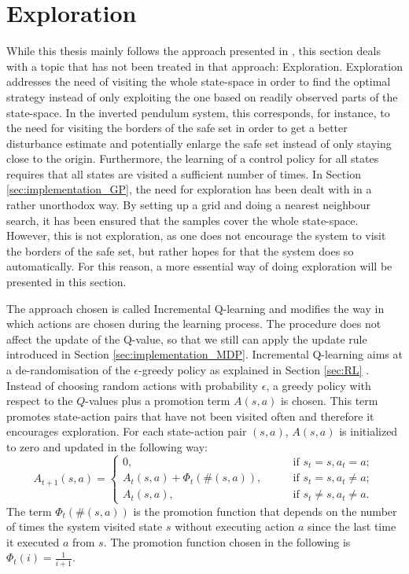 \documentclass[../main.tex]{subfiles}
\begin{document}
\section{Exploration} \label{sec:Exploration}
While this thesis mainly follows the approach presented in \cite{akametalu2014reachability}, this section deals with a topic that has not been treated in that approach: Exploration. Exploration addresses the need of visiting the whole state-space in order to find the optimal strategy instead of only exploiting the one based on readily observed parts of the state-space. In the inverted pendulum system, this corresponds, for instance, to the need for visiting the borders of the safe set in order to get a better disturbance estimate and potentially enlarge the safe set instead of only staying close to the origin. Furthermore, the learning of a control policy for all states requires that all states are visited a sufficient number of times. In Section \ref{sec:implementation_GP}, the need for exploration has been dealt with in a rather unorthodox way. By setting up a grid and doing a nearest neighbour search, it has been ensured that the samples cover the whole state-space. However, this is not exploration, as one does not encourage the system to visit the borders of the safe set, but rather hopes for that the system does so automatically. For this reason, a more essential way of doing exploration will be presented in this section. \par 
The approach chosen is called Incremental Q-learning and modifies the way in which actions are chosen during the learning process. The procedure does not affect the update of the Q-value, so that we still can apply the update rule introduced in Section \ref{sec:implementation_MDP}. Incremental Q-learning aims at a de-randomisation of the $\epsilon$-greedy policy as explained in Section \ref{sec:RL} \cite{even2001convergence}. Instead of choosing random actions with probability $\epsilon$, a greedy policy with respect to the $Q$-values plus a promotion term $A(s,a)$ is chosen. This term promotes state-action pairs that have not been visited often and therefore it encourages exploration. For each state-action pair $(s,a)$, $A(s,a)$ is initialized to zero and updated in the following way:
\begin{equation}
    A_{t+1}(s,a) = 
\begin{cases}
    0,\qquad &\text{if } s_t = s, a_t = a;\\    
    A_{t}(s,a) + \Phi_t(\#(s,a)),\qquad &\text{if } s_t = s, a_t \neq a;\\
    A_{t}(s,a),\qquad &\text{if } s_t \neq s, a_t \neq a.
\end{cases}
\end{equation}
The term $\Phi_t(\#(s,a))$ is the promotion function that depends on the number of times the system visited state $s$ without executing action $a$ since the last time it executed $a$ from $s$. The promotion function chosen in the following is $\Phi_t(i) = \frac{1}{i+1}$. 
\end{document}
